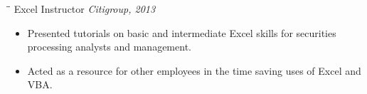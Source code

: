 \documentclass{res}
\begin{document}
\begin{resume}
 
 \begin{tabbing}
   \hspace{2.3in}\= \hspace{1.6in}\= \kill %
    Excel Instructor  \hspace{308 pt}  \textit{Citigroup, 2013} 
   \end{tabbing}
  \vspace{-10 pt}     %
\begin{itemize}
\item Presented tutorials on basic and intermediate Excel skills for securities processing analysts and management.
\item Acted as a resource for other employees in the time saving uses of Excel and VBA. 
\end{itemize}
\vspace{-15 pt}


\\




\end{resume}
\end{document}
